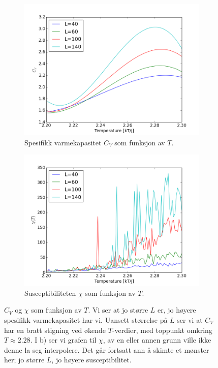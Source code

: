 \documentclass[11pt,a4paper]{article}
\begin{document}
\FloatBarrier
\begin{figure}[!ht]
\centering
\begin{subfigure}{.55\textwidth}
  \centering
  \includegraphics[width=1.1\linewidth]{4eCV.png}
  \caption{Spesifikk varmekapasitet $C_V$ som funksjon av $T$.}
  \label{hist1}
\end{subfigure}%
\begin{subfigure}{.55\textwidth}
  \centering
  \includegraphics[width=1.1\linewidth]{4eX.png}
  \caption{Susceptibiliteten $\chi$ som funksjon av $T$. }
  \label{hist2}
\end{subfigure}
\caption{$C_V$ og $\chi$ som funksjon av $T$. Vi ser at jo større $L$ er, jo høyere spesifikk varmekapasitet har vi. Uansett størrelse på $L$ ser vi at $C_V$ har en bratt stigning ved økende $T$-verdier, med toppunkt omkring $T \approx2.28$. I b) ser vi grafen til $\chi$, av en eller annen grunn ville ikke denne la seg interpolere. Det går fortsatt ann å skimte et mønster her; jo større $L$, jo høyere susceptibilitet.   }
\label{klaks2}
\end{figure}
\FloatBarrier
\end{document}
